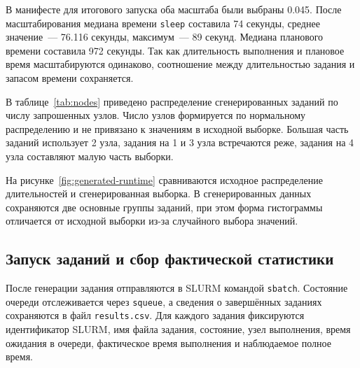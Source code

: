 В манифесте для итогового запуска оба масштаба были выбраны 0.045. После масштабирования медиана времени \texttt{sleep} составила 74 секунды, среднее значение~--- 76.116 секунды, максимум~--- 89 секунд. Медиана планового времени составила 972 секунды. Так как длительность выполнения и плановое время масштабируются одинаково, соотношение между длительностью задания и запасом времени сохраняется.

В таблице~\ref{tab:nodes} приведено распределение сгенерированных заданий по числу запрошенных узлов. Число узлов формируется по нормальному распределению и не привязано к значениям в исходной выборке. Большая часть заданий использует 2 узла, задания на 1 и 3 узла встречаются реже, задания на 4 узла составляют малую часть выборки.

\begin{table}[H]
    \centering
    \caption{Распределение сгенерированных заданий по числу узлов}
    \label{tab:nodes}
\end{table}

На рисунке~\ref{fig:generated-runtime} сравниваются исходное распределение длительностей и сгенерированная выборка. В сгенерированных данных сохраняются две основные группы заданий, при этом форма гистограммы отличается от исходной выборки из-за случайного выбора значений.


\subsection{Запуск заданий и сбор фактической статистики}

После генерации задания отправляются в SLURM командой \texttt{sbatch}. Состояние очереди отслеживается через \texttt{squeue}, а сведения о завершённых заданиях сохраняются в файл \texttt{results.csv}. Для каждого задания фиксируются идентификатор SLURM, имя файла задания, состояние, узел выполнения, время ожидания в очереди, фактическое время выполнения и наблюдаемое полное время.

